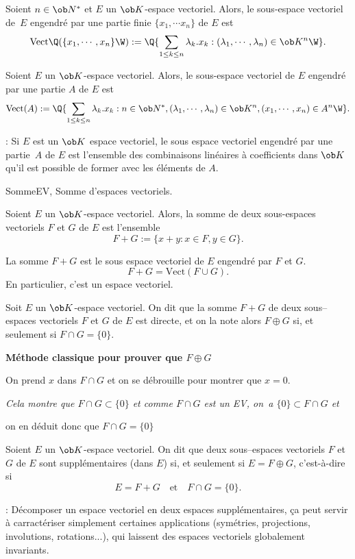 \Propriete []  Soient $n\in\ob N^*$ et $E$ un $\ob K$-espace vectoriel. Alors, le sous-espace vectoriel de~$E$ engendré par une partie finie 
$\{x_1,\cdots x_n\}$ de $E$ est 
$$
{
\mbox{Vect}\Q(\{ x_1, \cdots, x_n\}\W):=\Q\{\sum_{1\le k\le n}\lambda_k.x_k:(\lambda_1,\cdots,\lambda_n)\in\ob K^n\W\}}.
$$

\Propriete []  Soient $E$ un $\ob K$-espace vectoriel. Alors, le sous-espace vectoriel de $E$ engendré par une partie $A$ de $E$ est 
$$
\mbox{Vect}(A):=\Q\{\sum_{1\le k\le n}\lambda_k.x_k:n\in\ob N^*, (\lambda_1,\cdots,\lambda_n)\in\ob K^n, (x_1,\cdots, x_n)\in A^n\W\}.
$$

\Remarque : Si $E$ est un $\ob K$ espace vectoriel, le sous espace vectoriel engendré par une partie~$A$ de $E$ est l'ensemble des combinaisons linéaires à coefficients dans $\ob K$ qu'il est possible de former avec les éléments de $A$. 
\bigskip

\Subsection SommeEV, Somme d'espaces vectoriels. 
\bigskip

\noindent
Soient $E$ un $\ob K$-espace vectoriel. Alors, la somme de deux sous-espaces vectoriels $F$ et $G$ de $E$ est l'ensemble 
$$
F+G:=\{x+y:x\in F,y\in G\}. 
$$

\Propriete []  La somme $F+G$ est le sous espace vectoriel de $E$ engendré par $F$ et $G$. 
$$
F+G=\mbox{Vect}(F\cup G).
$$
En particulier, c'est un espace vectoriel. 
\bigskip


Soit $E$ un $\ob K$-espace vectoriel. On dit que la somme $F+G$ de deux sous--espaces vectoriels $F$ et $G$ de $E$ est directe, 
et on la note alors $F\oplus G$ si, et seulement si $F\cap G=\{0\}.$
\bigskip

\centerline{\bf Méthode classique pour prouver que $F\oplus G$}
\medskip\noindent
On prend $x$ dans $F\cap G$ et on se débrouille pour montrer que $x=0$. 

\noindent
{\it Cela montre que $F\cap G\subset\{0\}$ et comme $F\cap G$ est un EV, on~a $\{0\}\subset F\cap G$ et 

on en déduit donc que $F\cap G=\{0\}$}
\bigskip

Soient $E$ un $\ob K$-espace vectoriel. On dit que deux sous--espaces vectoriels $F$ et $G$ de $E$ 
sont supplémentaires (dans $E$) si, et seulement si $E=F\oplus G$, c'est-à-dire si 
$$
E=F+G\quad\mbox{et}\quad F\cap G=\{0\}.
$$

\Remarque : Décomposer un espace vectoriel en deux espaces supplémentaires, \c ca peut servir à carractériser simplement 
certaines applications (symétries, projections, involutions, rotations...), qui laissent des espaces vectoriels globalement invariants.
\bigskip

